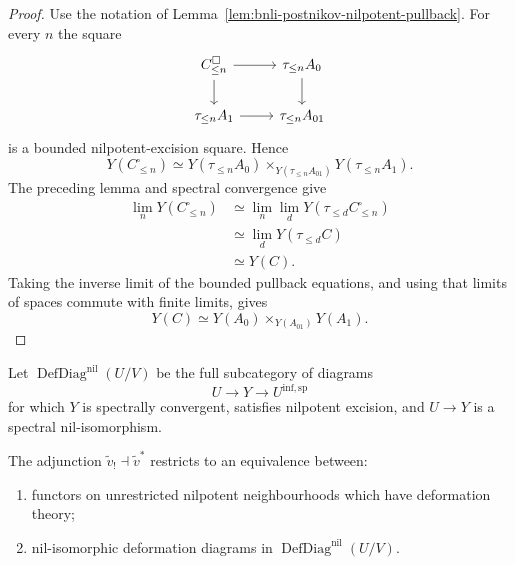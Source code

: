 \begin{proof}
Use the notation of
Lemma~\ref{lem:bnli-postnikov-nilpotent-pullback}.  For every $n$ the square
\[
\begin{tikzcd}
C^{\square}_{\leq n} \arrow[r] \arrow[d] &
\tau_{\leq n}A_0 \arrow[d]\\
\tau_{\leq n}A_1 \arrow[r] &
\tau_{\leq n}A_{01}
\end{tikzcd}
\]
is a bounded nilpotent-excision square.  Hence
\[
    Y(C^{\square}_{\leq n})
    \simeq
    Y(\tau_{\leq n}A_0)
    \times_{Y(\tau_{\leq n}A_{01})}
    Y(\tau_{\leq n}A_1).
\]
The preceding lemma and spectral convergence give
\[
\begin{aligned}
    \lim_nY(C^{\square}_{\leq n})
    &\simeq
    \lim_n\lim_d
    Y(\tau_{\leq d}C^{\square}_{\leq n})\\
    &\simeq
    \lim_dY(\tau_{\leq d}C)\\
    &\simeq Y(C).
\end{aligned}
\]
Taking the inverse limit of the bounded pullback equations, and using that
limits of spaces commute with finite limits, gives
\[
    Y(C)
    \simeq
    Y(A_0)\times_{Y(A_{01})}Y(A_1).
\]
\end{proof}

\begin{definition}
\label{def:bnli-nil-deformation-diagram}
Let $\operatorname{DefDiag}^{\mathrm{nil}}(U/V)$ be the full subcategory of
diagrams
\[
    U\longrightarrow Y\longrightarrow U^{\mathrm{inf,sp}}
\]
for which $Y$ is spectrally convergent, satisfies nilpotent excision, and
$U\to Y$ is a spectral nil-isomorphism.
\end{definition}

\begin{theorem}
\label{thm:bnli-second-stage-equivalence}
The adjunction $\widetilde v_!\dashv\widetilde v^*$ restricts to an
equivalence between:
\begin{enumerate}
    \item functors on unrestricted nilpotent neighbourhoods which have
    deformation theory;
    \item nil-isomorphic deformation diagrams in
    $\operatorname{DefDiag}^{\mathrm{nil}}(U/V)$.
\end{enumerate}
\end{theorem}

